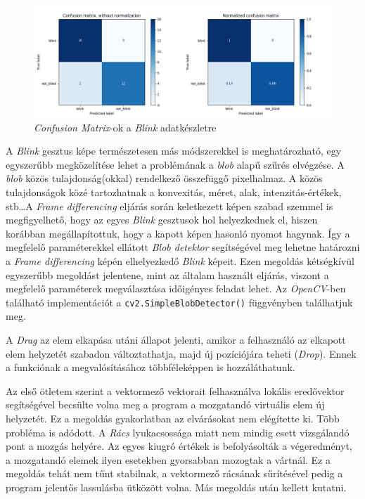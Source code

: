 \begin{figure}[h]
\centering
\includegraphics[width=\textwidth]{images/blink_confusion.png}
\caption{\textit{Confusion Matrix}-ok a \textit{Blink} adatkészletre}
\label{fig:blinkconfusion}
\end{figure}

A \textit{Blink} gesztus képe természetesen más módszerekkel is meghatározható, egy egyszerűbb megközelítése lehet a problémának a \textit{blob} alapű szűrés elvégzése. A \textit{blob} közös tulajdonság(okkal) rendelkező összefüggő pixelhalmaz. A közös tulajdonságok közé tartozhatnak a konvexitás, méret, alak, intenzitás-értékek, stb\ldots A \textit{Frame differencing} eljárás során keletkezett képen szabad szemmel is megfigyelhető, hogy az egyes \textit{Blink} gesztusok hol helyezkednek el, hiszen korábban megállapítottuk, hogy a kapott képen hasonló nyomot hagynak. Így a megfelelő paraméterekkel ellátott \textit{Blob detektor} segítségével meg lehetne határozni a \textit{Frame differencing} képén elhelyezkedő \textit{Blink} képeit. Ezen megoldás kétségkívül egyszerűbb megoldást jelentene, mint az általam használt eljárás, viszont a megfelelő paraméterek megválasztása időigényes feladat lehet. Az \textit{OpenCV}-ben található implementációt a \texttt{cv2.SimpleBlobDetector()} függvényben találhatjuk meg.


A \textit{Drag} az elem elkapása utáni állapot jelenti, amikor a felhasználó az elkapott elem helyzetét szabadon változtathatja, majd új pozíciójára teheti (\textit{Drop}). Ennek a funkciónak a megvalósításához többféleképpen is hozzáláthatunk.

Az első ötletem szerint a vektormező vektorait felhasználva lokális eredővektor segítségével becsülte volna meg a program a mozgatandó virtuális elem új helyzetét. Ez a megoldás gyakorlatban az elvárásokat nem elégítette ki. Több probléma is adódott. A \textit{Rács} lyukacsossága miatt nem mindig esett vizsgálandó pont a mozgás helyére. Az egyes kiugró értékek is befolyásolták a végeredményt, a mozgatandó elemek ilyen esetekben gyorsabban mozogtak a vártnál. Ez a megoldás tehát nem tűnt stabilnak, a vektormező rácsának sűrítésével pedig a program jelentős lassulásba ütközött volna. Más megoldás után kellett kutatni.

